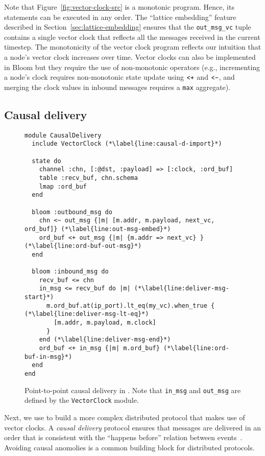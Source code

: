 Note that Figure~\ref{fig:vector-clock-src} is a monotonic program. Hence, its
statements can be executed in any order. The ``lattice embedding'' feature
described in Section~\ref{sec:lattice-embedding} ensures that the
\texttt{out\_msg\_vc} tuple contains a single vector clock that reflects all the
messages received in the current timestep. The monotonicity of the vector clock
program reflects our intuition that a node's vector clock increases over
time. Vector clocks can also be implemented in Bloom but they require the use of
non-monotonic operators (e.g., incrementing a node's clock requires
non-monotonic state update using $\verb|<+|$ and $\verb|<-|$, and merging the
clock values in inbound messages requires a \texttt{max} aggregate).

\subsection{Causal delivery}
\begin{figure}[t]
\begin{scriptsize}
\begin{lstlisting}
module CausalDelivery
  include VectorClock (*\label{line:causal-d-import}*)

  state do
    channel :chn, [:@dst, :payload] => [:clock, :ord_buf]
    table :recv_buf, chn.schema
    lmap :ord_buf
  end

  bloom :outbound_msg do
    chn <~ out_msg {|m| [m.addr, m.payload, next_vc, ord_buf]} (*\label{line:out-msg-embed}*)
    ord_buf <+ out_msg {|m| {m.addr => next_vc} } (*\label{line:ord-buf-out-msg}*)
  end

  bloom :inbound_msg do
    recv_buf <= chn
    in_msg <= recv_buf do |m| (*\label{line:deliver-msg-start}*)
      m.ord_buf.at(ip_port).lt_eq(my_vc).when_true { (*\label{line:deliver-msg-lt-eq}*)
        [m.addr, m.payload, m.clock]
      }
    end (*\label{line:deliver-msg-end}*)
    ord_buf <+ in_msg {|m| m.ord_buf} (*\label{line:ord-buf-in-msg}*)
  end
end
\end{lstlisting}
\end{scriptsize}
\caption{Point-to-point causal delivery in \lang. Note that \texttt{in\_msg} and
\texttt{out\_msg} are defined by the \texttt{VectorClock} module.}
\label{fig:causal-delivery-src}
\end{figure}

Next, we use \lang to build a more complex distributed protocol that makes use
of vector clocks. A \emph{causal delivery} protocol ensures that messages are
delivered in an order that is consistent with the ``happens before'' relation
between events~\cite{Lamport1978}. Avoiding causal anomolies is a common
building block for distributed protocols.

